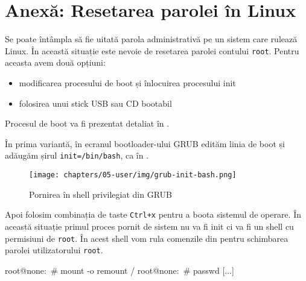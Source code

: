 
\section{Anexă: Resetarea parolei în Linux}
\label{sec:user:linux-password-recovery}

Se poate întâmpla să fie uitată parola administrativă pe un sistem care rulează
Linux. În această situație este nevoie de resetarea parolei contului \texttt{root}.
Pentru aceasta avem două opțiuni:

\begin{itemize}
  \item modificarea procesului de boot și înlocuirea procesului init
  \item folosirea unui stick USB  sau CD
    bootabil
\end{itemize}

Procesul de boot va fi prezentat detaliat în .

În prima variantă, în ecranul bootloader-ului GRUB  edităm linia de boot și
adăugăm șirul \texttt{init=/bin/bash}, ca în .

\begin{figure}[!htbp]
  \centering
  \texttt{[image: chapters/05-user/img/grub-init-bash.png]}
  \caption{Pornirea în shell privilegiat din GRUB}
  \label{fig:user:grub-init-bash}
\end{figure}

Apoi folosim combinația de taste \texttt{Ctrl+x} pentru a boota sistemul de operare. În
această situație primul proces pornit de sistem nu va fi init ci va fi un shell
cu permisiuni de \texttt{root}. În acest shell vom rula comenzile din  pentru
schimbarea parolei utilizatorului \texttt{root}.

\begin{screen}[caption={Schimbarea parolei contului root în shellul privilegiat},label={lst:user:change-root-pw}]
root@none:~# mount -o remount /
root@none:~# passwd
[...]
\end{screen}

